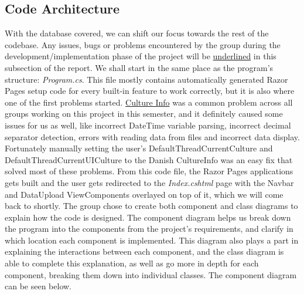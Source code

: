 \documentclass[12pt]{report}
\begin{document}
\subsection*{Code Architecture}
\label{sec:code}
With the database covered, we can shift our focus towards the rest of the codebase. Any issues, bugs or problems encountered
by the group during the development/implementation phase of the project will be \underline{underlined} in this subsection of the report.
We shall start in the same place as the program's structure: \textit{Program.cs}. This file mostly contains
automatically generated Razor Pages setup code for every built-in feature to work correctly, but it is also where one of the first problems started.
\underline{Culture Info} was a common problem across all groups working on this project in this semester, and it definitely caused some issues for us as well,
like incorrect DateTime variable parsing, incorrect decimal separator detection, errors with reading data from files and incorrect data display.
Fortunately manually setting the user's DefaultThreadCurrentCulture and DefaultThreadCurrentUICulture to the Danish CultureInfo
was an easy fix that solved most of these problems. From this code file, the Razor Pages applications gets built and the user gets redirected
to the \textit{Index.cshtml} page with the Navbar and DataUpload ViewComponents overlayed on top of it, which we will come back to shortly.
The group chose to create both component and class diagrams to explain how the code is designed. The component diagram helps us break down
the program into the components from the project's requirements, and clarify in which location each component is implemented.
This diagram also plays a part in explaining the interactions between each component, and the class diagram is able to complete this explanation,
as well as go more in depth for each component, breaking them down into individual classes. The component diagram can be seen below.

\end{document}
